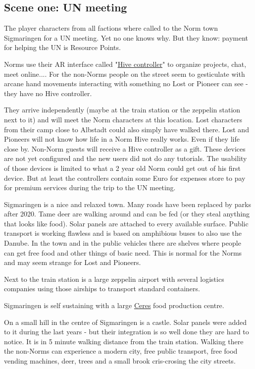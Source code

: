 \subsection{Scene one: UN meeting}

The player characters from all factions where called to the Norm town Sigmaringen for a UN meeting. Yet no one knows why. But they know: payment for helping the UN is Resource Points.

Norms use their AR interface called "\hyperref[sec:Hive controller]{Hive controller}" to organize projects, chat, meet online.... For the non-Norms people on the street seem to gesticulate with arcane hand movements interacting with something no Lost or Pioneer can see - they have no Hive controller.

They arrive independently (maybe at the train station or the zeppelin station next to it) and will meet the Norm characters at this location. Lost characters from their camp close to Albstadt could also simply have walked there. Lost and Pioneers will not know how life in a Norm Hive really works. Even if they life close by.
Non-Norm guests will receive a Hive controller as a gift. These devices are not yet configured and the new users did not do any tutorials. The usability of those devices is limited to what a 2 year old Norm could get out of his first device. But at least the controllers contain some Euro for expenses store to pay for premium services during the trip to the UN meeting.

Sigmaringen is a nice and relaxed town. Many roads have been replaced by parks after 2020. Tame deer are walking around and can be fed (or they steal anything that looks like food). Solar panels are attached to every available surface. Public transport is working flawless and is based on amphibious buses to also use the Danube. In the town and in the public vehicles there are shelves where people can get free food and other things of basic need. This is normal for the Norms and may seem strange for Lost and Pioneers.

Next to the train station is a large zeppelin airport with several logistics companies using those airships to transport standard containers.

Sigmaringen is self sustaining with a large \hyperref[sec: norm food]{Ceres} food production centre.

On a small hill in the centre of Sigmaringen is a castle. Solar panels were added to it during the last years - but their integration is so well done they are hard to notice. It is in 5 minute walking distance from the train station. Walking there the non-Norms can experience a modern city, free public transport, free food vending machines, deer, trees and a small brook cris-crosing the city streets.

